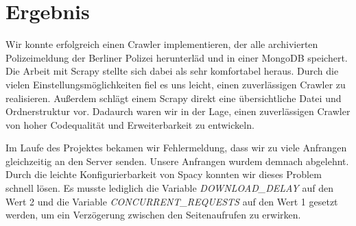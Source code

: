 \section{Ergebnis}

Wir konnte erfolgreich einen Crawler implementieren, der alle archivierten Polizeimeldung der Berliner Polizei herunterläd
und in einer MongoDB speichert. Die Arbeit mit Scrapy stellte sich dabei als sehr komfortabel heraus.
Durch die vielen Einstellungsmöglichkeiten fiel es uns leicht, einen zuverlässigen Crawler zu realisieren.
Außerdem schlägt einem Scrapy direkt eine übersichtliche Datei und Ordnerstruktur vor. Dadaurch waren wir in der Lage, einen zuverlässigen Crawler
von hoher Codequalität und Erweiterbarkeit zu entwickeln.

Im Laufe des Projektes bekamen wir Fehlermeldung, dass wir zu viele Anfrangen gleichzeitig an den Server senden.
Unsere Anfrangen wurdem demnach abgelehnt. Durch die leichte Konfigurierbarkeit von Spacy konnten wir dieses Problem schnell lösen.
Es musste lediglich die Variable \emph{DOWNLOAD\_DELAY} auf den Wert 2 und die Variable \emph{CONCURRENT\_REQUESTS} auf den Wert 1
gesetzt werden, um ein Verzögerung zwischen den Seitenaufrufen zu erwirken.



